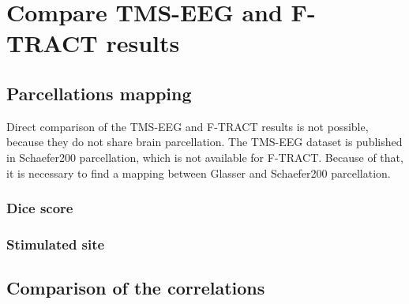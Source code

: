 \chapter{Compare TMS-EEG and F-TRACT results}\label{ch:compare}



\section{Parcellations mapping}

Direct comparison of the TMS-EEG and F-TRACT results is not possible, because they do not share brain parcellation. The TMS-EEG dataset is published in Schaefer200 parcellation, which is not available for F-TRACT. Because of that, it is necessary to find a mapping between Glasser and Schaefer200 parcellation.

\subsection{Dice score}\label{sec:dice}

\subsection{Stimulated site}\label{sec:parcellations-mapping-stimulated_roi}


\section{Comparison of the correlations}\label{sec:dice}
